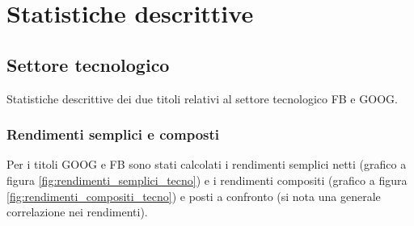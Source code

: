 \documentclass{article}
\begin{document}
\section{Statistiche descrittive}

\subsection{Settore tecnologico}

Statistiche descrittive dei due titoli relativi al settore tecnologico FB e GOOG.

\subsubsection{Rendimenti semplici e composti}

Per i titoli GOOG e FB sono stati calcolati i rendimenti semplici netti (grafico a figura \ref{fig:rendimenti_semplici_tecno}) e i rendimenti compositi (grafico a figura \ref{fig:rendimenti_compositi_tecno}) e posti a confronto
(si nota una generale correlazione nei rendimenti).
\end{document}
